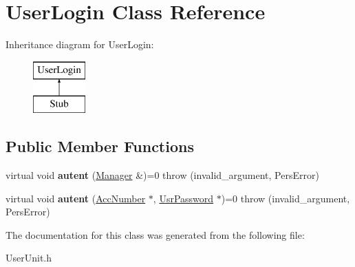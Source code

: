 \hypertarget{classUserLogin}{\section{User\-Login Class Reference}
\label{d4/de1/classUserLogin}
}
Inheritance diagram for User\-Login\-:\begin{figure}[H]
\begin{center}
\leavevmode
\includegraphics[height=2.000000cm]{d4/de1/classUserLogin}
\end{center}
\end{figure}
\subsection*{Public Member Functions}
\begin{DoxyCompactItemize}
\item 
\hypertarget{classUserLogin_ab719bf1f8aa34f6e4c3285ac33022e76}{virtual void {\bfseries autent} (\hyperlink{classManager}{Manager} \&)=0  throw (invalid\-\_\-argument, Pers\-Error)}\label{d4/de1/classUserLogin_ab719bf1f8aa34f6e4c3285ac33022e76}

\item 
\hypertarget{classUserLogin_a7163b2b97915fd0e3e5d3f76c2af44da}{virtual void {\bfseries autent} (\hyperlink{classAccNumber}{Acc\-Number} $\ast$, \hyperlink{classUsrPassword}{Usr\-Password} $\ast$)=0  throw (invalid\-\_\-argument, Pers\-Error)}\label{d4/de1/classUserLogin_a7163b2b97915fd0e3e5d3f76c2af44da}

\end{DoxyCompactItemize}


The documentation for this class was generated from the following file\-:\begin{DoxyCompactItemize}
\item 
User\-Unit.\-h\end{DoxyCompactItemize}
